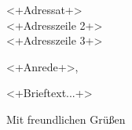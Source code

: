 \documentclass[BriefformatJ+R]{scrlttr2}
\begin{document}

\begin{letter}{<+Adressat+>\\ <+Adresszeile 2+>\\ <+Adresszeile 3+>}

\opening{<+Anrede+>,}

<+Brieftext...+>

\closing{Mit freundlichen Grüßen}

\end{letter}
\end{document}
